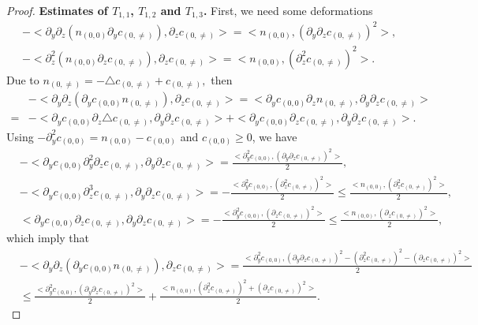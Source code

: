 \documentclass[12pt, reqno]{amsart}
\numberwithin{equation}{section}
\begin{document}
\begin{proof}
		\textbf{Estimates of $T_{1,1}$, $T_{1,2}$ and $T_{1,3}$.}	
		First, we need some deformations
		\begin{align}
			&-<\partial_y\partial_z(n_{(0,0)}\partial_yc_{(0,\neq)}),\partial_zc_{(0,\neq)}>=
			<n_{(0,0)},(\partial_y\partial_zc_{(0,\neq)})^2>,
			\label{n0_temp1}\\
			&-<\partial_z^2(n_{(0,0)}\partial_zc_{(0,\neq)}),\partial_zc_{(0,\neq)}>=<n_{(0,0)},(\partial_z^2c_{(0,\neq)})^2>.\label{n0_temp2}
		\end{align}
		Due to $n_{(0,\neq)}=-\triangle c_{(0,\neq)}+c_{(0,\neq)},$ 
		then 
		\begin{equation*}
			\begin{aligned}
				&-<\partial_y\partial_z(\partial_{y}c_{(0,0)}n_{(0,\neq)}),
				\partial_zc_{(0,\neq)}>=
				<\partial_{y}c_{(0,0)}\partial_zn_{(0,\neq)},
				\partial_y\partial_zc_{(0,\neq)}>\\
				=&-<\partial_{y}c_{(0,0)}\partial_z\triangle c_{(0,\neq)},
				\partial_y\partial_zc_{(0,\neq)}>
				+<\partial_{y}c_{(0,0)}\partial_z c_{(0,\neq)},
				\partial_y\partial_zc_{(0,\neq)}>.			
			\end{aligned}
		\end{equation*}
		Using $-\partial_y^2c_{(0,0)}=n_{(0,0)}-c_{(0,0)}$ and $c_{(0,0)}\geq0$, we have 
		\begin{align*}
			&-<\partial_{y}c_{(0,0)}\partial_y^2\partial_z c_{(0,\neq)},
			\partial_y\partial_zc_{(0,\neq)}>=\frac{<\partial_{y}^2c_{(0,0)},(\partial_y\partial_zc_{(0,\neq)})^2>}{2},\\
			&-<\partial_{y}c_{(0,0)}\partial_z^3 c_{(0,\neq)},
			\partial_y\partial_zc_{(0,\neq)}>=
			-\frac{<\partial_{y}^2c_{(0,0)},(\partial_z^2c_{(0,\neq)})^2>}{2}
			\leq \frac{<n_{(0,0)},(\partial_z^2c_{(0,\neq)})^2>}{2}
			,\\
			&<\partial_{y}c_{(0,0)}\partial_z c_{(0,\neq)},
			\partial_y\partial_zc_{(0,\neq)}>=
			-\frac{<\partial_{y}^2c_{(0,0)},(\partial_zc_{(0,\neq)})^2>}{2}
			\leq \frac{<n_{(0,0)},(\partial_zc_{(0,\neq)})^2>}{2},
		\end{align*}	
		which imply that 	
		\begin{equation}\label{n0_temp3}
			\begin{aligned}
				&-<\partial_y\partial_z(\partial_{y}c_{(0,0)}n_{(0,\neq)}),
				\partial_zc_{(0,\neq)}>
				=\frac{<\partial_{y}^2c_{(0,0)},(\partial_y\partial_zc_{(0,\neq)})^2-(\partial_z^2c_{(0,\neq)})^2-(\partial_zc_{(0,\neq)})^2>}{2}
				\\
				&\leq \frac{<\partial_{y}^2c_{(0,0)}
					,(\partial_y\partial_zc_{(0,\neq)})^2>}{2}
				+\frac{<n_{(0,0)},(\partial_z^2c_{(0,\neq)})^2+
					(\partial_zc_{(0,\neq)})^2>}{2}.
			\end{aligned}
		\end{equation}
		

\end{proof}
\end{document}

